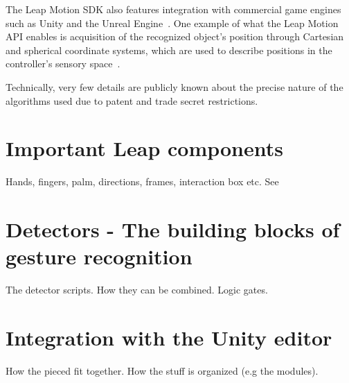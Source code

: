 The Leap Motion SDK also features integration with commercial game engines such as Unity and the Unreal Engine~\citep{Guna2014}. One example of what the Leap Motion API enables is acquisition of the recognized object's position through Cartesian and spherical coordinate systems, which are used to describe positions in the controller's sensory space~\citep{Guna2014}.  

Technically, very few details are publicly known about the precise nature of the algorithms used due to patent and trade secret restrictions.

\section{Important Leap components}
Hands, fingers, palm, directions, frames, interaction box etc. See \\


\section{Detectors - The building blocks of gesture recognition}
The detector scripts. How they can be combined. Logic gates. 

\section{Integration with the Unity editor}
How the pieced fit together. How the stuff is organized (e.g the modules).
